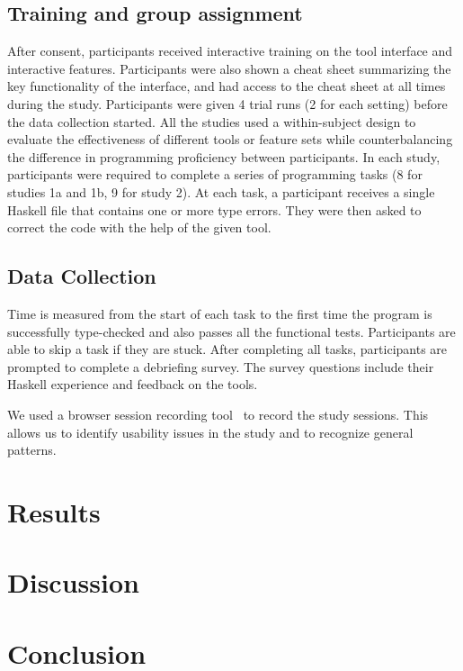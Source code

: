 \subsection{\textbf{Training and group assignment}}
After consent, participants received interactive training on the tool interface and interactive features. Participants were also shown a cheat sheet summarizing the key functionality of the interface, and had access to the cheat sheet at all times during the study. Participants were given 4 trial runs (2 for each setting) before the data collection started. 
All the studies used a within-subject design to evaluate the effectiveness of different tools or feature sets while counterbalancing the difference in programming proficiency between participants. In each study, participants were required to complete a series of programming tasks (8 for studies 1a and 1b, 9 for study 2). At each task, a participant receives a single Haskell file that contains one or more type errors. They were then asked to correct the code with the help of the given tool.


\subsection{\textbf{Data Collection}}
Time is measured from the start of each task to the first time the program is successfully type-checked and also passes all the functional tests. Participants are able to skip a task if they are stuck. 
After completing all tasks, participants are prompted to complete a debriefing survey. The survey questions include their Haskell experience and feedback on the tools.

We used a browser session recording tool~\cite{openreplay_openreplay_2022} to record the study sessions. This allows us to identify usability issues in the study and to recognize general patterns. 

\section{Results}

\section{Discussion}
\section{Conclusion}

